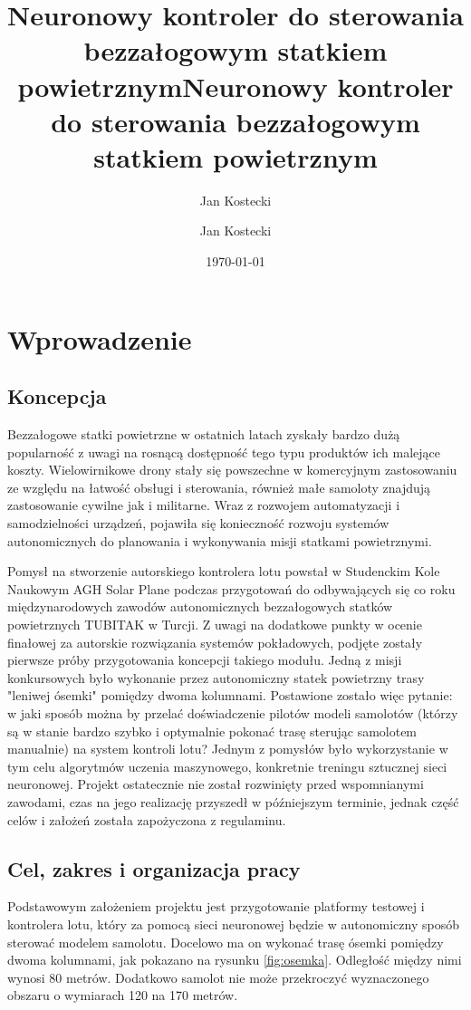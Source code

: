 \documentclass[12pt, a4paper]{article}
\title{Neuronowy kontroler do sterowania bezzałogowym statkiem powietrznym}
\author{Jan Kostecki}
\title{Neuronowy kontroler do sterowania bezzałogowym statkiem powietrznym}
\author{Jan Kostecki}
\date{\today}
\begin{document}
\onehalfspacing


\newpage
\tableofcontents

\clearpage

\section{Wprowadzenie}
\subsection{Koncepcja}

Bezzałogowe statki powietrzne w ostatnich latach zyskały bardzo dużą popularność z uwagi na rosnącą dostępność tego typu produktów ich malejące koszty. Wielowirnikowe drony stały się powszechne w komercyjnym zastosowaniu ze względu na łatwość obsługi i sterowania, również małe samoloty znajdują zastosowanie cywilne jak i militarne. Wraz z rozwojem automatyzacji i samodzielności urządzeń, pojawiła się konieczność rozwoju systemów autonomicznych do planowania i wykonywania misji statkami powietrznymi.

Pomysł na stworzenie autorskiego kontrolera lotu powstał w Studenckim Kole Naukowym AGH Solar Plane podczas przygotowań do odbywających się co roku międzynarodowych zawodów autonomicznych bezzałogowych statków powietrznych TUBITAK w Turcji. Z uwagi na dodatkowe punkty w ocenie finałowej za autorskie rozwiązania systemów pokładowych, podjęte zostały pierwsze próby przygotowania koncepcji takiego modułu. Jedną z misji konkursowych było wykonanie przez autonomiczny statek powietrzny trasy "leniwej ósemki" pomiędzy dwoma kolumnami. Postawione zostało więc pytanie: w jaki sposób można by przelać doświadczenie pilotów modeli samolotów (którzy są w stanie bardzo szybko i optymalnie pokonać trasę sterując samolotem manualnie) na system kontroli lotu? Jednym z pomysłów było wykorzystanie w tym celu algorytmów uczenia maszynowego, konkretnie treningu sztucznej sieci neuronowej. Projekt ostatecznie nie został rozwinięty przed wspomnianymi zawodami, czas na jego realizację przyszedł w późniejszym terminie, jednak część celów i założeń została zapożyczona z regulaminu.

\subsection{Cel, zakres i organizacja pracy}
Podstawowym założeniem projektu jest przygotowanie platformy testowej i kontrolera lotu, który za pomocą sieci neuronowej będzie w autonomiczny sposób sterować modelem samolotu. Docelowo ma on wykonać trasę ósemki pomiędzy dwoma kolumnami, jak pokazano na rysunku \ref{fig:osemka}. Odległość między nimi wynosi 80 metrów. Dodatkowo samolot nie może przekroczyć wyznaczonego obszaru o wymiarach 120 na 170 metrów.
\end{document}
